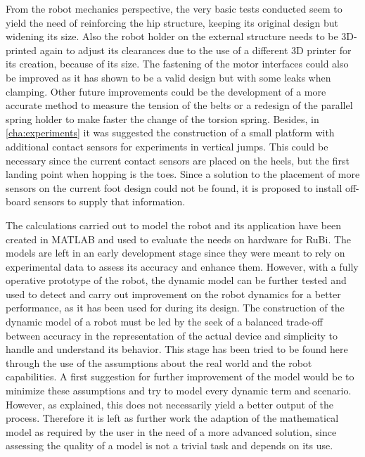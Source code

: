 From the robot mechanics perspective, the very basic tests conducted seem to yield the need of reinforcing the hip structure, keeping its original design but widening its size.
Also the robot holder on the external structure needs to be 3D-printed again to adjust its clearances due to the use of a different 3D printer for its creation, because of its size.
The fastening of the motor interfaces could also be improved as it has shown to be a valid design but with some leaks when clamping.
Other future improvements could be the development of a more accurate method to measure the tension of the belts or a redesign of the parallel spring holder to make faster the change of the torsion spring.
Besides, in \ref{cha:experiments} it was suggested the construction of a small platform with additional contact sensors for experiments in vertical jumps.
This could be necessary since the current contact sensors are placed on the heels, but the first landing point when hopping is the toes.
Since a solution to the placement of more sensors on the current foot design could not be found, it is proposed to install off-board sensors to supply that information.

The calculations carried out to model the robot and its application have been created in MATLAB and used to evaluate the needs on hardware for RuBi.
The models are left in an early development stage since they were meant to rely on experimental data to assess its accuracy and enhance them.
However, with a fully operative prototype of the robot, the dynamic model can be further tested and used to detect and carry out improvement on the robot dynamics for a better performance, as it has been used for during its design. 
The construction of the dynamic model of a robot must be led by the seek of a balanced trade-off between accuracy in the representation of the actual device and simplicity to handle and understand its behavior.
This stage has been tried to be found here through the use of the assumptions about the real world and the robot capabilities.
A first suggestion for further improvement of the model would be to minimize these assumptions and try to model every dynamic term and scenario.
However, as explained, this does not necessarily yield a better output of the process.
Therefore it is left as further work the adaption of the mathematical model as required by the user in the need of a more advanced solution, since assessing the quality of a model is not a trivial task and depends on its use.

